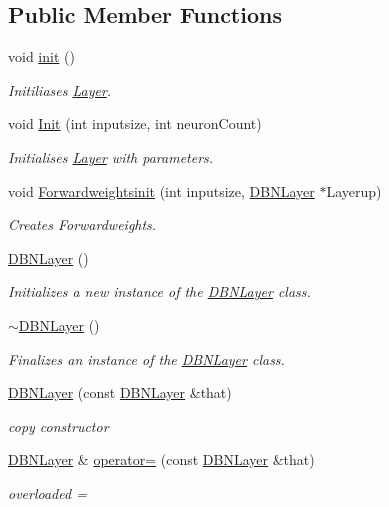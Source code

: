 \subsection*{Public Member Functions}
\begin{DoxyCompactItemize}
\item 
void \hyperlink{class_n_n_t_lib_1_1_d_b_n_layer_ab6584bd72b2c0e095c8ddb58c1cc865d}{init} ()
\begin{DoxyCompactList}\small\item\em Initiliases \hyperlink{class_n_n_t_lib_1_1_layer}{Layer}. \end{DoxyCompactList}\item 
void \hyperlink{class_n_n_t_lib_1_1_d_b_n_layer_abde30250c496e42499d5bfcb79d6bcf9}{Init} (int inputsize, int neuron\+Count)
\begin{DoxyCompactList}\small\item\em Initialises \hyperlink{class_n_n_t_lib_1_1_layer}{Layer} with parameters. \end{DoxyCompactList}\item 
void \hyperlink{class_n_n_t_lib_1_1_d_b_n_layer_a3b0f2969d1fb6299f696ddb9ad1d198d}{Forwardweightsinit} (int inputsize, \hyperlink{class_n_n_t_lib_1_1_d_b_n_layer}{D\+B\+N\+Layer} $\ast$Layerup)
\begin{DoxyCompactList}\small\item\em Creates Forwardweights. \end{DoxyCompactList}\item 
\hyperlink{class_n_n_t_lib_1_1_d_b_n_layer_a1455fdf1fa76f4547bca76afee41e20f}{D\+B\+N\+Layer} ()
\begin{DoxyCompactList}\small\item\em Initializes a new instance of the \hyperlink{class_n_n_t_lib_1_1_d_b_n_layer}{D\+B\+N\+Layer} class. \end{DoxyCompactList}\item 
\hyperlink{class_n_n_t_lib_1_1_d_b_n_layer_ad7846b8b6b33704fe1ab27aa35d363a4}{$\sim$\+D\+B\+N\+Layer} ()
\begin{DoxyCompactList}\small\item\em Finalizes an instance of the \hyperlink{class_n_n_t_lib_1_1_d_b_n_layer}{D\+B\+N\+Layer} class. \end{DoxyCompactList}\item 
\hyperlink{class_n_n_t_lib_1_1_d_b_n_layer_a412a96132c7464a7502b203bc316920b}{D\+B\+N\+Layer} (const \hyperlink{class_n_n_t_lib_1_1_d_b_n_layer}{D\+B\+N\+Layer} \&that)
\begin{DoxyCompactList}\small\item\em copy constructor \end{DoxyCompactList}\item 
\hyperlink{class_n_n_t_lib_1_1_d_b_n_layer}{D\+B\+N\+Layer} \& \hyperlink{class_n_n_t_lib_1_1_d_b_n_layer_ac6c411ae0e17e002c89e93ebeefb6a11}{operator=} (const \hyperlink{class_n_n_t_lib_1_1_d_b_n_layer}{D\+B\+N\+Layer} \&that)
\begin{DoxyCompactList}\small\item\em overloaded = \end{DoxyCompactList}\end{DoxyCompactItemize}
